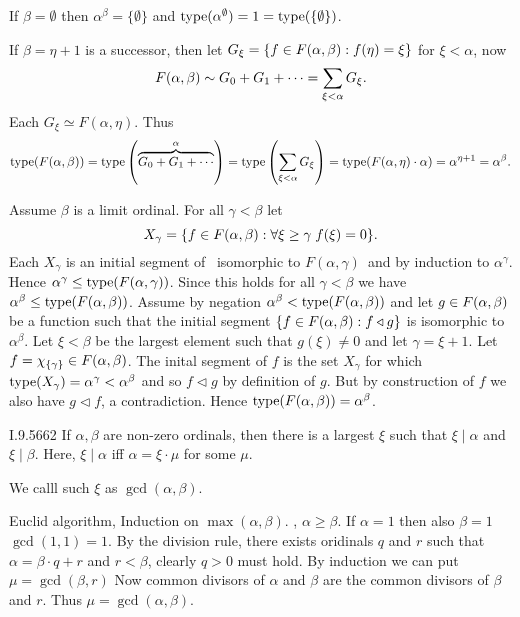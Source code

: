 {If \(\beta=\emptyset\) then \(\alpha^\beta=\{\emptyset\}\)
and \(\mathop{\mathrm{type}}(\alpha^\emptyset)=1=\mathop{\mathrm{type}}(\{\emptyset\})\).

\newcommand*{\Faet}{\ensuremath{F(\alpha, \eta)}}
\newcommand*{\Fag}{\ensuremath{F(\alpha, \gamma)}}
If \(\beta=\eta+1\) is a successor, then
let \(G_\xi = \{f\in F(\alpha, \beta):f(\eta)=\xi\}\) for \(\xi<\alpha\), now
\begin{equation*}
F(\alpha, \beta) \sim G_0 + G_1 + \cdots = \sum_{\xi<\alpha} G_\xi.
\end{equation*}
Each \(G_\xi \simeq \Faet\). Thus
\begin{equation*}
\type(\Fab) = \type\left(\overbrace{G_0 + G_1 + \cdots}^\alpha\right)
  = \type\left(\sum_{\xi<\alpha} G_\xi\right)
  = \type(\Faet\cdot\alpha)
  = \alpha^{\eta+1} = \alpha^\beta.
\end{equation*}

Assume \(\beta\) is a limit ordinal.
For all \(\gamma < \beta\) let
\begin{equation*}
X_\gamma = \{f\in F(\alpha, \beta): \forall \xi\geq\gamma\; f(\xi)=0\}.
\end{equation*}
Each \(X_\gamma\) is an initial segment of \Fab\ isomorphic
to \Fag\ and by induction to \(\alpha^\gamma\).
ׁHence \(\alpha^{\gamma}\leq \type(\Fag)\).
Since this holds for all \(\gamma < \beta\) we have
\(\alpha^\beta \leq \mathop{\mathrm{type}}(F(\alpha, \beta))\).
Assume by negation \(\alpha^\beta < \mathop{\mathrm{type}}(F(\alpha, \beta))\)
and let \(g\in F(\alpha, \beta)\) be a function such that the initial segment
\(\{f\in F(\alpha, \beta):f\triangleleft g\}\) is isomorphic to \(\alpha^\beta\).
Let \(\xi<\beta\) be the largest element such that
\(g⁢(\xi)\neq 0\) and let \(\gamma=\xi+1\).
Let \(f=\chi_{\{\gamma\}} \in F(\alpha, \beta)\).
The inital segment of $f$ is the set \(X_\gamma\) for which
\(\mathop{\mathrm{type}}(X_\gamma) = \alpha^\gamma < \alpha^\beta\)
and so \(f\triangleleft g\) by definition of $g$.
But by construction of $f$ we also have \(g\triangleleft f\), a contradiction.
Hence \(\mathop{\mathrm{type}}(F(\alpha, \beta)) = \alpha^\beta\).
} %

\begin{lexcopy}{I.9.56}{62}
If \(\alpha,\beta\) are non-zero ordinals, then there is a largest \(\xi\) such
that \(\xi \mid \alpha\) and \(\xi \mid \beta\).
Here, \(\xi \mid \alpha\) iff \(\alpha = \xi\cdot\mu\) for some \(\mu\).
\end{lexcopy}
We calll such \(\xi\) as \(\gcd(\alpha,\beta)\).

Euclid algorithm,
Induction on \(\max(\alpha,\beta)\).
\Wlogy, \(\alpha\geq \beta\).
If \(\alpha = 1\) then also \(\beta=1\) \(\gcd(1,1)=1\).
By the division rule, there exists oridinals
$q$ and $r$ such that \(\alpha = \beta\cdot q + r\)
and \(r<\beta\), clearly \(q > 0\) must hold.
By induction we can put \(\mu = \gcd(\beta, r)\)
Now common divisors of \(\alpha\) and \(\beta\)
are the common divisors of \(\beta\) and $r$.
Thus \(\mu = \gcd(\alpha, \beta)\).


